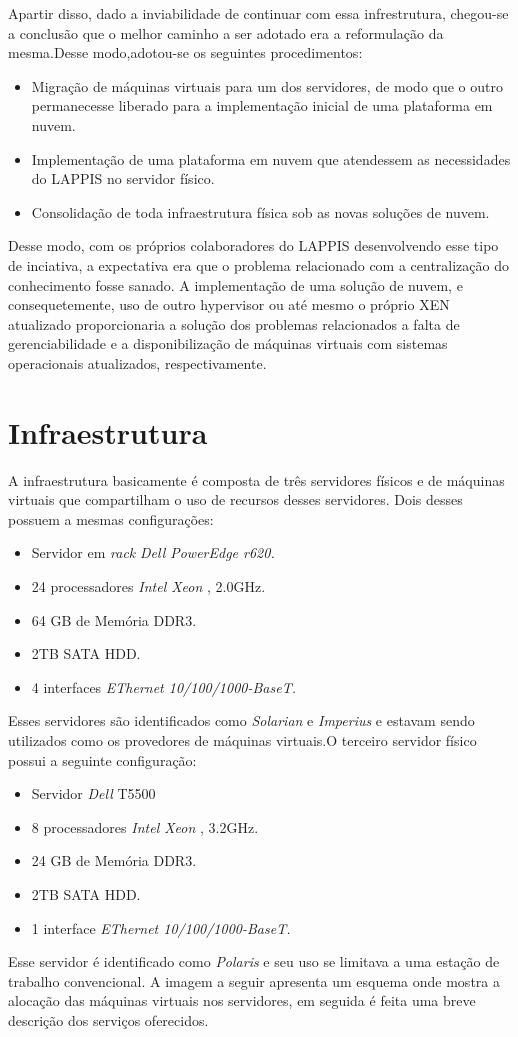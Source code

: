       Apartir disso, dado a inviabilidade de continuar com essa infrestrutura, chegou-se a conclusão que o melhor caminho a ser adotado era a reformulação da mesma.Desse modo,adotou-se os seguintes procedimentos:
\begin{itemize}
      \item Migração de máquinas virtuais para um dos servidores, de modo que o outro permanecesse liberado para a implementação inicial de uma plataforma em nuvem.
      \item	Implementação de uma plataforma em nuvem que atendessem as necessidades do LAPPIS no servidor físico.
      \item Consolidação de toda infraestrutura física sob as novas soluções de nuvem.
\end{itemize}      
      
      
Desse modo, com os próprios colaboradores do LAPPIS desenvolvendo esse tipo de inciativa, a expectativa era que o problema relacionado com a centralização do conhecimento fosse sanado. A implementação de uma solução de nuvem, e consequetemente, uso de outro hypervisor ou até mesmo o próprio XEN atualizado proporcionaria a solução dos problemas relacionados a falta de gerenciabilidade e a disponibilização de máquinas virtuais com sistemas operacionais atualizados, respectivamente.        
                
\section{Infraestrutura}
A infraestrutura basicamente é composta de três servidores físicos e de máquinas virtuais que compartilham o uso de recursos desses servidores. Dois desses possuem a mesmas configurações: 
\begin{itemize}
	\item Servidor em \textit{rack} \textit{Dell PowerEdge r620.}
	\item 24 processadores \textit{Intel Xeon }, 2.0GHz.
	\item 64 GB de Memória DDR3.
	\item 2TB SATA HDD.
	\item 4 interfaces \textit{EThernet 10/100/1000-BaseT.}
\end{itemize}
Esses servidores são identificados como \textit{Solarian} e \textit{Imperius} e estavam sendo utilizados como os provedores de máquinas virtuais.O terceiro servidor físico possui a seguinte configuração:
\begin{itemize}
	\item Servidor \textit{Dell} T5500
	\item 8 processadores \textit{Intel Xeon }, 3.2GHz.
	\item 24 GB de Memória DDR3.
	\item 2TB SATA HDD.
	\item 1 interface \textit{EThernet 10/100/1000-BaseT.}
\end{itemize} 
Esse servidor é identificado como \textit{Polaris} e seu uso se limitava a uma estação de trabalho convencional. A imagem a seguir apresenta um esquema onde mostra a alocação das máquinas virtuais nos servidores, em seguida é feita uma breve descrição dos serviços oferecidos.

